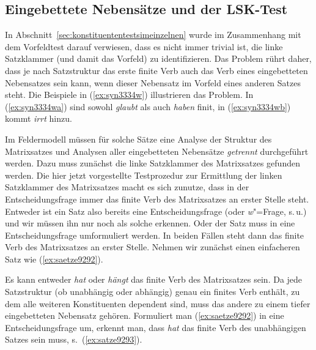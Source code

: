 \subsection{Eingebettete Nebensätze und der LSK-Test}

\label{sec:lsktest}

In Abschnitt~\ref{sec:konstituententestsimeinzelnen} wurde im Zusammenhang mit dem Vorfeldtest darauf verwiesen, dass es nicht immer trivial ist, die linke Satzklammer (und damit das Vorfeld) zu identifizieren.
Das Problem rührt daher, dass je nach Satzstruktur das erste finite Verb auch das Verb eines eingebetteten Nebensatzes sein kann, wenn dieser Nebensatz \zB im Vorfeld eines anderen Satzes steht.
Die Beispiele in (\ref{ex:syn3334w}) illustrieren das Problem.
In (\ref{ex:syn3334wa}) sind sowohl \textit{glaubt} als auch \textit{haben} finit, in (\ref{ex:syn3334wb}) kommt \textit{irrt} hinzu.

\begin{exe}
  \ex\label{ex:syn3334w}
  \begin{xlist}
  \end{xlist}
\end{exe}

Im Feldermodell müssen für solche Sätze eine Analyse der Struktur des Matrixsatzes und Analysen aller eingebetteten Nebensätze \textit{getrennt} durchgeführt werden.
Dazu muss zunächst die linke Satzklammer des Matrixsatzes gefunden werden.
Die hier jetzt vorgestellte Testprozedur zur Ermittlung der linken Satzklammer des Matrixsatzes macht es sich zunutze, dass in der Entscheidungsfrage immer das finite Verb des Matrixsatzes an erster Stelle steht.
Entweder ist ein Satz also bereits eine Entscheidungsfrage (oder \textit{w}"=Frage, s.\,u.) und wir müssen ihn nur noch als solche erkennen.
Oder der Satz muss in eine Entscheidungsfrage umformuliert werden.
In beiden Fällen steht dann das finite Verb des Matrixsatzes an erster Stelle.
Nehmen wir zunächst einen einfacheren Satz wie (\ref{ex:saetze9292}).

\begin{exe}
\end{exe}

Es kann entweder \textit{hat} oder \textit{hängt} das finite Verb des Matrixsatzes sein.
Da jede Satzstruktur (ob unabhängig oder abhängig) genau ein finites Verb enthält, zu dem alle weiteren Konstituenten dependent sind, muss das andere zu einem tiefer eingebetteten Nebensatz gehören.
Formuliert man (\ref{ex:saetze9292}) in eine Entscheidungsfrage um, erkennt man, dass \textit{hat} das finite Verb des unabhängigen Satzes sein muss, s.\ (\ref{ex:satze9293}).

